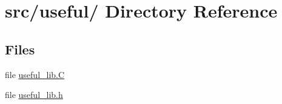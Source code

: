 \hypertarget{dir_000011}{
\section{src/useful/ Directory Reference}
\label{dir_000011}
}
\subsection*{Files}
\begin{CompactItemize}
\item 
file \hyperlink{useful__lib_8C}{useful\_\-lib.C}
\item 
file \hyperlink{useful__lib_8h}{useful\_\-lib.h}
\end{CompactItemize}
